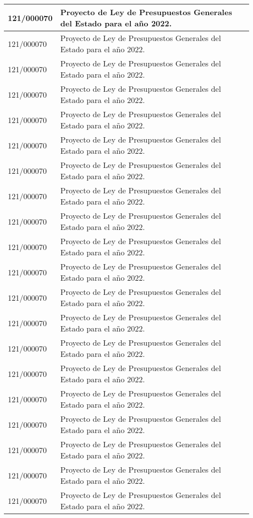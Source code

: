 {\begin{table}[H]
\begin{center}
\begin{tabularx}{\linewidth}{| l | X |}
\hline
121/000070 & Proyecto de Ley de Presupuestos Generales del Estado para el año 2022. \\
\hline
121/000070 & Proyecto de Ley de Presupuestos Generales del Estado para el año 2022. \\
\hline
121/000070 & Proyecto de Ley de Presupuestos Generales del Estado para el año 2022. \\
\hline
121/000070 & Proyecto de Ley de Presupuestos Generales del Estado para el año 2022. \\
\hline
121/000070 & Proyecto de Ley de Presupuestos Generales del Estado para el año 2022. \\
\hline
121/000070 & Proyecto de Ley de Presupuestos Generales del Estado para el año 2022. \\
\hline
121/000070 & Proyecto de Ley de Presupuestos Generales del Estado para el año 2022. \\
\hline
121/000070 & Proyecto de Ley de Presupuestos Generales del Estado para el año 2022. \\
\hline
121/000070 & Proyecto de Ley de Presupuestos Generales del Estado para el año 2022. \\
\hline
121/000070 & Proyecto de Ley de Presupuestos Generales del Estado para el año 2022. \\
\hline
121/000070 & Proyecto de Ley de Presupuestos Generales del Estado para el año 2022. \\
\hline
121/000070 & Proyecto de Ley de Presupuestos Generales del Estado para el año 2022. \\
\hline
121/000070 & Proyecto de Ley de Presupuestos Generales del Estado para el año 2022. \\
\hline
121/000070 & Proyecto de Ley de Presupuestos Generales del Estado para el año 2022. \\
\hline
121/000070 & Proyecto de Ley de Presupuestos Generales del Estado para el año 2022. \\
\hline
121/000070 & Proyecto de Ley de Presupuestos Generales del Estado para el año 2022. \\
\hline
121/000070 & Proyecto de Ley de Presupuestos Generales del Estado para el año 2022. \\
\hline
121/000070 & Proyecto de Ley de Presupuestos Generales del Estado para el año 2022. \\
\hline
121/000070 & Proyecto de Ley de Presupuestos Generales del Estado para el año 2022. \\
\hline
121/000070 & Proyecto de Ley de Presupuestos Generales del Estado para el año 2022. \\

\end{tabularx}
\end{center}
\end{table}}
